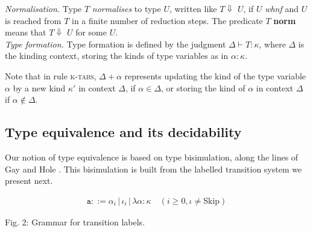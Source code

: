 \documentclass[sigplan]{acmart}
\newcommand{\srule}[1]{\textsc{#1}}
\begin{document}
\textit{Normalisation.   } Type $T$ \textit{normalises} to type $U$, written like $T\Downarrow$ $U$, if $U$ \textit{whnf} and $U$ is reached from $T$ in a finite number of reduction steps. The predicate $T$ \textbf{norm} means that $T\Downarrow$ $U$ for some $U$.\\

\textit{Type formation.    }
Type formation is defined by the judgment $\Delta\vdash T:\kappa$, where $\Delta$ is the kinding context, storing the kinds of type variables as in $\alpha:\kappa$.\\

\vspace{2mm}

Note that in rule \srule{k-tabs}, $\Delta + \alpha$ represents updating the kind of the type variable $\alpha$ by a new kind $\kappa'$ in context $\Delta$, if $\alpha\in\Delta$, or storing the kind of $\alpha$ in context $\Delta$ if $\alpha\notin\Delta$.\\

\subsection{Type equivalence and its decidability} 
Our notion of type equivalence is based on type bisimulation, along the lines of Gay and Hole \cite{DBLP:journals/acta/GayH05}. This bisimulation is built from the labelled transition system \cite{Sangiorgi_2011} we present next.

\begin{align*}
    \mathtt a ::= \alpha_i \, | \, \iota_i \, | \, \lambda \alpha\colon \kappa \quad (i \geq 0, \iota \neq \text{Skip}) 
\end{align*}

\begin{center}
    Fig. 2: Grammar for transition labels.
\end{center}
\end{document}
